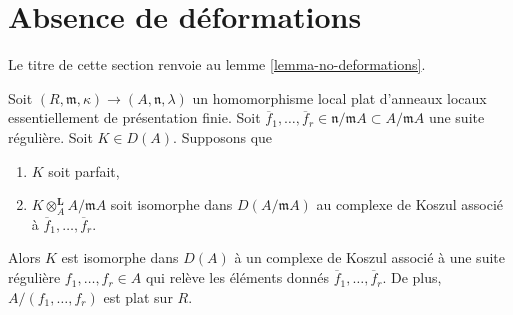 \section{Absence de déformations}
\label{section-no-deformations}

\noindent
Le titre de cette section renvoie au lemme \ref{lemma-no-deformations}.

\begin{lemma}
\label{lemma-deform-koszul}
Soit $(R, \mathfrak m, \kappa) \to (A, \mathfrak n, \lambda)$
un homomorphisme local plat d'anneaux locaux
essentiellement de présentation finie.
Soit $\overline{f}_1, \ldots, \overline{f}_r \in \mathfrak n/\mathfrak m A
\subset A/\mathfrak m A$ une suite régulière. Soit $K \in D(A)$. Supposons que
\begin{enumerate}
\item $K$ soit parfait,
\item $K \otimes_A^\mathbf{L} A/\mathfrak m A$ soit isomorphe dans
$D(A/\mathfrak m A)$ au
complexe de Koszul associé à $\overline{f}_1, \ldots, \overline{f}_r$.
\end{enumerate}
Alors $K$ est isomorphe dans $D(A)$ à un complexe de Koszul associé à une suite
régulière $f_1, \ldots, f_r \in A$ qui relève les éléments donnés
$\overline{f}_1, \ldots, \overline{f}_r$. De plus, $A/(f_1, \ldots, f_r)$
est plat sur $R$.
\end{lemma}

